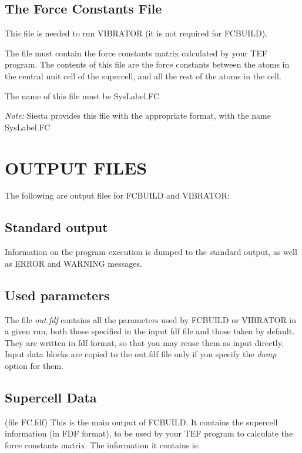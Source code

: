 \subsection{The Force Constants File}

\noindent
This file is needed to run VIBRATOR (it is not required for
FCBUILD).  

\noindent
The file must contain the force constants matrix calculated
by your TEF program. The contents of this file
are the force constants between the atoms in the central
unit cell of the supercell, and all the rest of the
atoms in the cell. 

\noindent
The name of this file must be SysLabel.FC

\noindent
{\it Note:} Siesta provides this file with the appropriate
format, with the name SysLabel.FC

\section{OUTPUT FILES}

The following are output files for FCBUILD and VIBRATOR:

\subsection{Standard output}
Information on the program execution is dumped to the standard
output, as well as ERROR and WARNING messages.


\subsection{Used parameters}
The file {\it out.fdf} contains all the parameters used by FCBUILD
or VIBRATOR
in a given run, both those specified in the input fdf file and
those taken by default. They are written in fdf format, so that
you may reuse them as input directly. Input data blocks are 
copied to the out.fdf file only if you specify the {\it dump} option
for them.

\subsection{Supercell Data}
(file FC.fdf)
This is the main output of FCBUILD. It contains the supercell
information (in FDF format), to be used by your TEF program
to calculate the force constants matrix.
The information it contains is:

